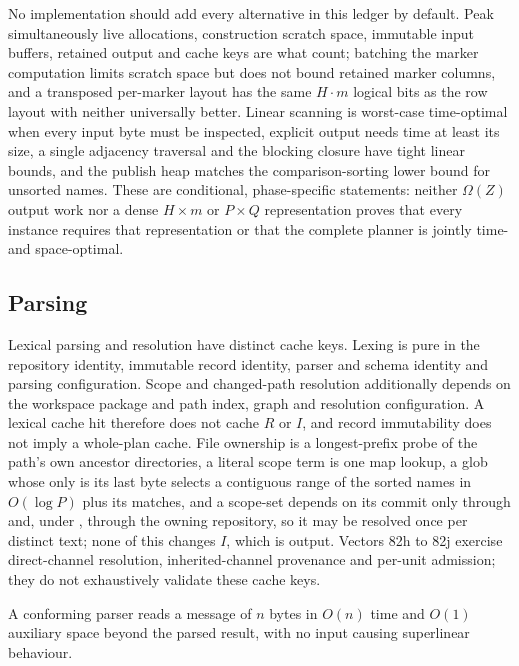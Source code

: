 No implementation should add every alternative in this ledger by default.
Peak simultaneously live allocations, construction scratch space, immutable
input buffers, retained output and cache keys are what count; batching the
marker computation limits scratch space but does not bound retained marker
columns, and a transposed per-marker layout has the same $H \cdot m$ logical
bits as the row layout with neither universally better. Linear scanning is
worst-case time-optimal when every input byte must be inspected, explicit
output needs time at least its size, a single adjacency traversal and the
blocking closure have tight linear bounds, and the publish heap matches the
comparison-sorting lower bound for unsorted names. These are conditional,
phase-specific statements: neither $\Omega(Z)$ output work nor a dense $H
\times m$ or $P \times Q$ representation proves that every instance requires
that representation or that the complete planner is jointly time- and
space-optimal.

\subsection{Parsing}

Lexical parsing and resolution have distinct cache keys. Lexing is pure in the
repository identity, immutable record identity, parser and schema identity and
parsing configuration. Scope and changed-path resolution additionally depends
on the workspace package and path index, graph and resolution configuration. A
lexical cache hit therefore does not cache $R$ or $I$, and record immutability
does not imply a whole-plan cache. File ownership is a longest-prefix probe of
the path's own ancestor directories, a literal scope term is one map lookup, a
glob whose only \code{*} is its last byte selects a contiguous range of the
sorted names in $O(\log P)$ plus its matches, and a scope-set depends on its
commit only through  and, under , through the owning
repository, so it may be resolved once per distinct text; none of this changes
$I$, which is output. Vectors 82h to 82j exercise direct-channel resolution,
inherited-channel provenance and per-unit admission; they do not exhaustively
validate these cache keys.

\begin{proposition}
\label{prop:parse}
A conforming parser reads a message of $n$ bytes in $O(n)$ time and $O(1)$
auxiliary space beyond the parsed result, with no input causing superlinear
behaviour.
\end{proposition}

